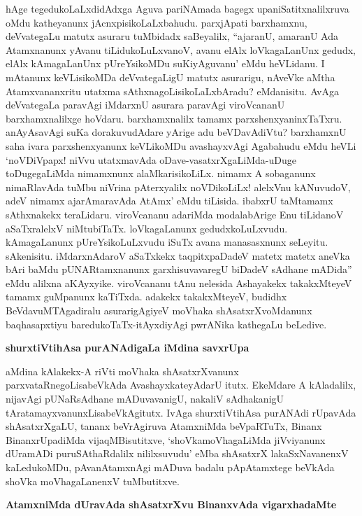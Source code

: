 hAge tegedukoLaLxdidAdxga Aguva pariNAmada bagegx upaniSatitxnalilxruva oMdu katheyanunx jAcnxpisikoLaLxbahudu. parxjApati barxhamxnu, deVvategaLu matutx asuraru tuMbidadx saBeyalilx, ``ajaranU, amaranU Ada Atamxnanunx yAvanu tiLidukoLuLxvanoV, avanu elAlx loVkagaLanUnx gedudx, elAlx kAmagaLanUnx pUreYsikoMDu suKiyAguvanu' eMdu heVLidanu. I mAtanunx keVLisikoMDa deVvategaLigU matutx asurarigu, nAveVke aMtha Atamxvananxritu utatxma sAthxnagoLisikoLaLxbAradu? eMdanisitu. AvAga deVvategaLa paravAgi iMdarxnU asurara paravAgi viroVcananU barxhamxnalilxge hoVdaru. barxhamxnalilx tamamx parxshenxyaninxTaTxru. anAyAsavAgi suKa dorakuvudAdare yArige adu beVDavAdiVtu? barxhamxnU saha ivara parxshenxyanunx keVLikoMDu avashayxvAgi Agabahudu eMdu heVLi `noVDiVpapx! niVvu utatxmavAda oDave-vasatxrXgaLiMda-uDuge toDugegaLiMda nimamxnunx alaMkarisikoLiLx. nimamx A sobaganunx nimaRlavAda tuMbu niVrina pAterxyalilx noVDikoLiLx! alelxVnu kANuvudoV, adeV nimamx ajarAmaravAda AtAmx' eMdu tiLisida. ibabxrU taMtamamx sAthxnakekx teraLidaru. viroVcananu adariMda modalabArige Enu tiLidanoV aSaTxralelxV niMtubiTaTx. loVkagaLanunx gedudxkoLuLxvudu. kAmagaLanunx pUreYsikoLuLxvudu iSuTx avana manasasxnunx seLeyitu. sAkenisitu. iMdarxnAdaroV aSaTxkekx taqpitxpaDadeV matetx matetx aneVka bAri baMdu pUNARtamxnanunx garxhisuvavaregU biDadeV sAdhane mADida'' eMdu alilxna aKAyxyike. viroVcananu tAnu nelesida Ashayakekx takakxMteyeV tamamx guMpanunx kaTiTxda. adakekx takakxMteyeV, budidhx BeVdavuMTAgadiralu asurarigAgiyeV moVhaka shAsatxrXvoMdanunx baqhasapxtiyu baredukoTaTx-itAyxdiyAgi pwrANika kathegaLu beLedive.

{\bigskip
\noindent
{\large\bf shurxtiVtihAsa purANAdigaLa iMdina savxrUpa}}\label{page187}
\medskip

\noindent
aMdina kAlakekx-A riVti moVhaka shAsatxrXvanunx parxvataRnegoLisabeVkAda AvashayxkateyAdarU itutx. EkeMdare A kAladalilx, nijavAgi pUNaRsAdhane mADuvavanigU, nakaliV sAdhakanigU tAratamayxvanunxLisabeVkAgitutx. IvAga shurxtiVtihAsa purANAdi rUpavAda shAsatxrXgaLU, tananx beVrAgiruva AtamxniMda beVpaRTuTx, Binanx BinanxrUpadiMda vijaqMBisutitxve, `shoVkamoVhagaLiMda jiVviyanunx dUramADi puruSAthaRdalilx nililxsuvudu' eMba shAsatxrX lakaSxNavanenxV kaLedukoMDu, pAvanAtamxnAgi mADuva badalu pApAtamxtege beVkAda shoVka moVhagaLanenxV tuMbutitxve.

{\bigskip
\noindent
{\large\bf AtamxniMda dUravAda shAsatxrXvu BinanxvAda vigarxhadaMte}}\label{page188}
\medskip

